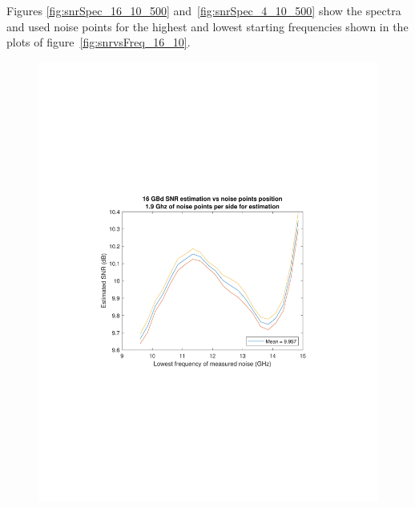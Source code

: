 \begin{refsection}
Figures \ref{fig:snrSpec_16_10_500} and~\ref{fig:snrSpec_4_10_500} show the 
spectra and used noise points for the highest and lowest starting frequencies 
shown 
in the plots of figure~\ref{fig:snrvsFreq_16_10}.



\begin{figure}[H]
	\centering
	\begin{minipage}{0.43\textwidth}
		\centering
		\includegraphics[clip, trim=4cm 8cm 4cm 8cm,
		width=1\textwidth]{./sdf/m_qam_system/figures/snr/curveAndConf/16GhzSNRcurve.pdf}
		\subcaption{\label{fig:snrVsFreq_16_10_500}}
	\end{minipage}
	\begin{minipage}{0.43\textwidth}
		\centering

\end{minipage}
\end{figure}
\end{refsection}
